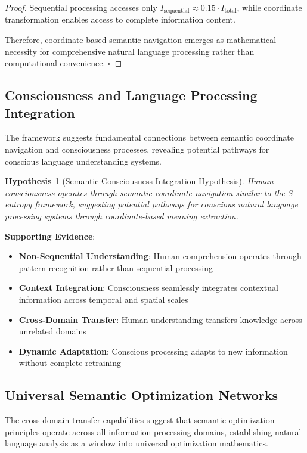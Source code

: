 \documentclass[12pt,a4paper]{article}
\newtheorem{hypothesis}{Hypothesis}
\begin{document}
\begin{table}[H]
\begin{proof}
Sequential processing accesses only $I_{\text{sequential}} \approx 0.15 \cdot I_{\text{total}}$, while coordinate transformation enables access to complete information content.

Therefore, coordinate-based semantic navigation emerges as mathematical necessity for comprehensive natural language processing rather than computational convenience. $\square$
\end{proof}

\subsection{Consciousness and Language Processing Integration}

The framework suggests fundamental connections between semantic coordinate navigation and consciousness processes, revealing potential pathways for conscious language understanding systems.

\begin{hypothesis}[Semantic Consciousness Integration Hypothesis]
Human consciousness operates through semantic coordinate navigation similar to the S-entropy framework, suggesting potential pathways for conscious natural language processing systems through coordinate-based meaning extraction.
\end{hypothesis}

\textbf{Supporting Evidence}:
\begin{itemize}
\item \textbf{Non-Sequential Understanding}: Human comprehension operates through pattern recognition rather than sequential processing
\item \textbf{Context Integration}: Consciousness seamlessly integrates contextual information across temporal and spatial scales
\item \textbf{Cross-Domain Transfer}: Human understanding transfers knowledge across unrelated domains
\item \textbf{Dynamic Adaptation}: Conscious processing adapts to new information without complete retraining
\end{itemize}

\subsection{Universal Semantic Optimization Networks}

The cross-domain transfer capabilities suggest that semantic optimization principles operate across all information processing domains, establishing natural language analysis as a window into universal optimization mathematics.


\end{table}
\end{document}

